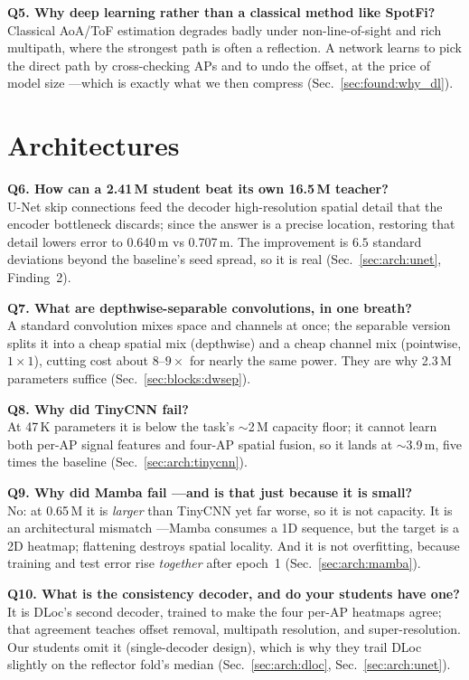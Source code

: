 \textbf{Q5. Why deep learning rather than a classical method like SpotFi?}\\
Classical AoA/ToF estimation degrades badly under non-line-of-sight and rich multipath, where the
strongest path is often a reflection. A network learns to pick the direct path by cross-checking APs
and to undo the offset, at the price of model size ---which is exactly what we then compress
(Sec.~\ref{sec:found:why_dl}).

\section{Architectures}
\label{sec:qa:arch}

\textbf{Q6. How can a 2.41\,M student beat its own 16.5\,M teacher?}\\
U-Net skip connections feed the decoder high-resolution spatial detail that the encoder bottleneck
discards; since the answer is a precise location, restoring that detail lowers error to 0.640\,m vs
0.707\,m. The improvement is $6.5$ standard deviations beyond the baseline's seed spread, so it is real
(Sec.~\ref{sec:arch:unet}, Finding~2).

\textbf{Q7. What are depthwise-separable convolutions, in one breath?}\\
A standard convolution mixes space and channels at once; the separable version splits it into a cheap
spatial mix (depthwise) and a cheap channel mix (pointwise, $1\times1$), cutting cost about
$8$--$9\times$ for nearly the same power. They are why 2.3\,M parameters suffice
(Sec.~\ref{sec:blocks:dwsep}).

\textbf{Q8. Why did TinyCNN fail?}\\
At 47\,K parameters it is below the task's $\sim$2\,M capacity floor; it cannot learn both per-AP signal
features and four-AP spatial fusion, so it lands at $\sim$3.9\,m, five times the baseline
(Sec.~\ref{sec:arch:tinycnn}).

\textbf{Q9. Why did Mamba fail ---and is that just because it is small?}\\
No: at 0.65\,M it is \emph{larger} than TinyCNN yet far worse, so it is not capacity. It is an
architectural mismatch ---Mamba consumes a 1D sequence, but the target is a 2D heatmap; flattening
destroys spatial locality. And it is not overfitting, because training and test error rise
\emph{together} after epoch~1 (Sec.~\ref{sec:arch:mamba}).

\textbf{Q10. What is the consistency decoder, and do your students have one?}\\
It is DLoc's second decoder, trained to make the four per-AP heatmaps agree; that agreement teaches
offset removal, multipath resolution, and super-resolution. Our students omit it (single-decoder
design), which is why they trail DLoc slightly on the reflector fold's median
(Sec.~\ref{sec:arch:dloc}, Sec.~\ref{sec:arch:unet}).

